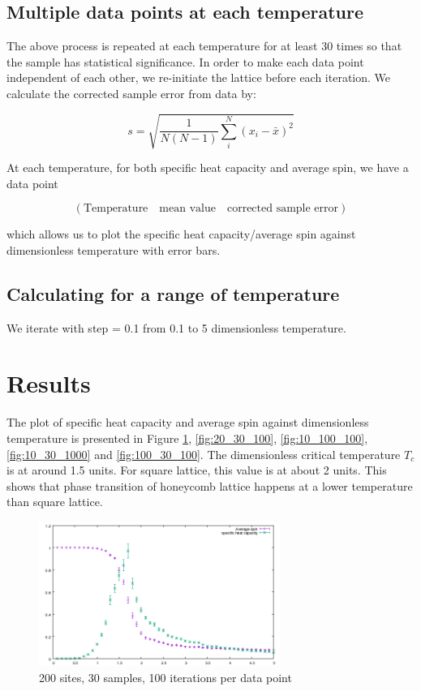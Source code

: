 \documentclass{article}
\begin{document}
\subsection{Multiple data points at each temperature}
\label{sec-2-4}

The above process is repeated at each temperature for at least 30
times so that the sample has statistical significance. In order to
make each data point independent of each other, we re-initiate the
lattice before each iteration. We calculate the corrected sample
error from data by:

$$s = \sqrt{\frac{1}{N(N -1) } \sum_i^N (x_i - \bar{x})^2}$$

At each temperature, for both specific heat capacity and average
spin, we have a data point

$$(\text{Temperature}\quad \text{mean value} \quad \text{corrected sample error})$$

which allows us to plot the specific heat capacity/average spin
against dimensionless temperature with error bars.

\subsection{Calculating for a range of temperature}
\label{sec-2-5}

We iterate with step = 0.1 from 0.1 to 5 dimensionless temperature.

\section{Results}
\label{sec-3}

The plot of specific heat capacity and average spin against
dimensionless temperature is presented in Figure
\ref{fig:10_30_100}, \ref{fig:20_30_100}, \ref{fig:10_100_100},
\ref{fig:10_30_1000} and \ref{fig:100_30_100}. The dimensionless
critical temperature $T_c$ is at around 1.5 units. For square
lattice, this value is at about 2 units. This shows that phase
transition of honeycomb lattice happens at a lower temperature than
square lattice.

\begin{figure}[H]
  \centering
  \includegraphics[width = 0.7\textwidth]{figures/200_sites_100_iterations_30_samples.png}
  \caption{200 sites, 30 samples, 100 iterations per data point}
  \label{fig:10_30_100}
\end{figure}
\end{document}
